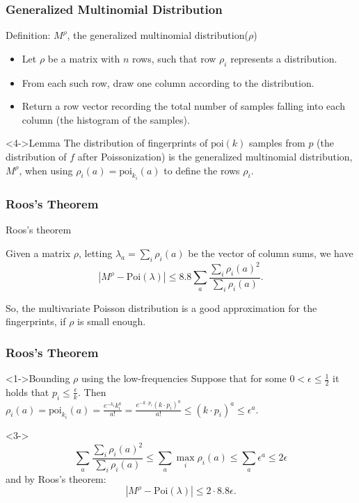 \documentclass{beamer}
\newcommand{\eps}{\epsilon} \newcommand{\lam}{\lambda}
\begin{document}
\begin{frame}
  \frametitle{Generalized Multinomial Distribution}
  \begin{block}{Definition: $M^\rho$, the generalized multinomial
      distribution($\rho$)}
  
    \begin{itemize}
    \item<1-> Let $\rho$ be a matrix with $n$ rows, such that row
      $\rho_i$ represents a distribution.
    \item<2-> From each such row, draw one column according to the
      distribution.
    \item<3-> Return a row vector recording the total number of
      samples falling into each column (the histogram of the samples).
    \end{itemize}
  \end{block}

  \begin{block}<4->{Lemma} The distribution of fingerprints of
    $\mbox{poi}(k)$ samples from $p$ (the distribution of $f$ after
    Poissonization) is the generalized multinomial distribution,
    $M^\rho$, when using $\rho_i(a)=\mbox{poi}_{k_i}(a)$ to define the
    rows $\rho_i$.
  \end{block}
\end{frame}

\begin{frame}
  \frametitle{Roos's Theorem}
  \begin{block}{Roos's theorem}
    
    Given a matrix $\rho$, letting $\lambda_a=\sum_i\rho_i(a)$ be the
    vector of column sums, we have
    \begin{equation*}
      |M^\rho-\mbox{Poi}(\lambda)|\le
      8.8\sum_a\frac{\sum_i\rho_i(a)^2}{\sum_i \rho_i(a)}.
    \end{equation*}
  \end{block}
  So, the multivariate Poisson distribution is a good approximation
  for the fingerprints, if $\rho$ is small enough.
\end{frame}
\begin{frame}
  \frametitle{Roos's Theorem}

  \begin{block}<1->{Bounding $\rho$ using the low-frequencies}
    Suppose that for some $0<\eps\le\frac{1}{2}$ it holds that $p_i\le
    \frac{\eps}{k}$. Then
    $\rho_i(a)=\mbox{poi}_{k_i}(a)=\frac{e^{-k_i}k_i^a}{a!}=\frac{e^{-k\cdot
        p_i}(k\cdot p_i)^a}{a!}\le (k\cdot p_i) ^a\le \eps^a$.
  \end{block}

  \begin{block}<3->{}
    \begin{equation*}
      \sum_a\frac{\sum_i\rho_i(a)^2}{\sum_i \rho_i(a)}\le \sum_a\max_i \rho_i(a)\le \sum_a \eps^a\le 2\eps
    \end{equation*}
    and by Roos's theorem:
    \begin{equation*}
      |M^\rho-\mbox{Poi}(\lambda)|\le 2\cdot 8.8\eps.       
    \end{equation*}
  \end{block}
\end{frame}
\end{document}
